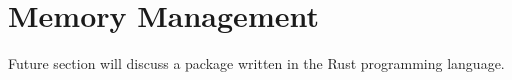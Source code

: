 \section{Memory Management}

Future section will discuss a package written in the Rust programming language.